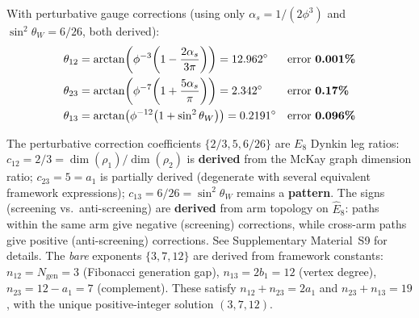 \documentclass[12pt,a4paper]{article}
\theoremstyle{definition}
\begin{document}
With perturbative gauge corrections (using only $\alpha_s = 1/(2\phi^3)$ and $\sin^2\theta_W = 6/26$, both derived):
\begin{align}
\theta_{12} &= \arctan\!\left(\phi^{-3}\!\left(1 - \frac{2\alpha_s}{3\pi}\right)\right) = 12.962^\circ && \text{error \textbf{0.001\%}} \\
\theta_{23} &= \arctan\!\left(\phi^{-7}\!\left(1 + \frac{5\alpha_s}{\pi}\right)\right) = 2.342^\circ && \text{error \textbf{0.17\%}} \\
\theta_{13} &= \arctan\!\left(\phi^{-12}\!\left(1 + \sin^2\theta_W\right)\right) = 0.2191^\circ && \text{error \textbf{0.096\%}}
\end{align}

The perturbative correction coefficients $\{2/3, 5, 6/26\}$ are $E_8$ Dynkin leg ratios: $c_{12} = 2/3 = \dim(\rho_1)/\dim(\rho_2)$ is \textbf{derived} from the McKay graph dimension ratio; $c_{23} = 5 = a_1$ is partially derived (degenerate with several equivalent framework expressions); $c_{13} = 6/26 = \sin^2\theta_W$ remains a \textbf{pattern}.  The signs (screening vs.\ anti-screening) are \textbf{derived} from arm topology on $\hat{E}_8$: paths within the same arm give negative (screening) corrections, while cross-arm paths give positive (anti-screening) corrections.  See Supplementary Material~S9 for details.  The \emph{bare} exponents $\{3, 7, 12\}$ are derived from framework constants: $n_{12} = N_{\text{gen}} = 3$ (Fibonacci generation gap), $n_{13} = 2b_1 = 12$ (vertex degree), $n_{23} = 12 - a_1 = 7$ (complement).  These satisfy $n_{12} + n_{23} = 2a_1$ and $n_{23} + n_{13} = 19$, with the unique positive-integer solution $(3, 7, 12)$.
\end{document}
